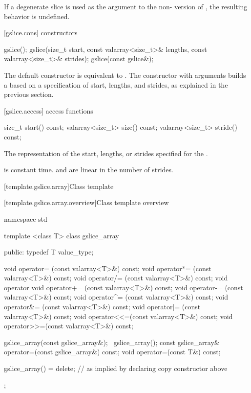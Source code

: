 \pnum
If a degenerate slice is used as the argument to the
non-
version of
,
the resulting behavior is undefined.
%

[gslice.cons]{ constructors}

%
\begin{itemdecl}
gslice();
gslice(size_t start, const valarray<size_t>& lengths,
         const valarray<size_t>& strides);
gslice(const gslice&);
\end{itemdecl}

\begin{itemdescr}
\pnum
The default constructor is equivalent to
.
The constructor with arguments builds a
based on a specification of start, lengths, and strides, as explained
in the previous section.
\end{itemdescr}

[gslice.access]{ access functions}

%
%
%
\begin{itemdecl}
size_t           start()  const;
valarray<size_t> size() const;
valarray<size_t> stride() const;
\end{itemdecl}

\begin{itemdescr}
\pnum
\returns The representation of the
start, lengths, or strides specified for the .

\pnum
\complexity {} is constant time.  and 
are linear in the number of strides.
\end{itemdescr}

[template.gslice.array]{Class template }

[template.gslice.array.overview]{Class template  overview}

%
\begin{codeblock}
namespace std {
  template <class T> class gslice_array {
  public:
    typedef T value_type;

    void operator=  (const valarray<T>&) const;
    void operator*= (const valarray<T>&) const;
    void operator/= (const valarray<T>&) const;
    void operator%
    void operator+= (const valarray<T>&) const;
    void operator-= (const valarray<T>&) const;
    void operator^= (const valarray<T>&) const;
    void operator&= (const valarray<T>&) const;
    void operator|= (const valarray<T>&) const;
    void operator<<=(const valarray<T>&) const;
    void operator>>=(const valarray<T>&) const;

    gslice_array(const gslice_array&);
    ~gslice_array();
    const gslice_array& operator=(const gslice_array&) const;
    void operator=(const T&) const;

    gslice_array() = delete;      // as implied by declaring copy constructor above
  };
}
\end{codeblock}

